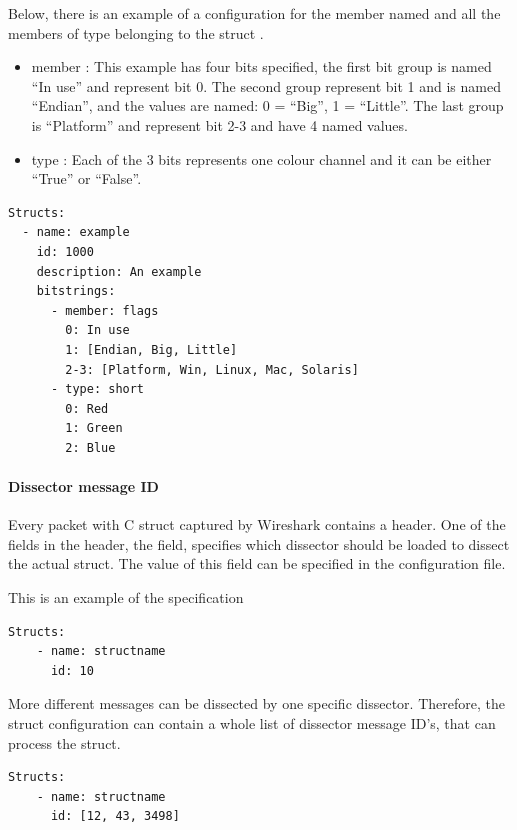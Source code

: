 \documentclass[A4paper,10pt,english]{sphinxmanual}
\begin{document}
Below, there is an example of a configuration for the member named  and all the members of  type belonging to the struct .
\begin{itemize}
\item {} 
member : This example has four bits specified, the first bit group is named ``In use'' and represent bit 0. The second group represent bit 1 and is named ``Endian'', and the values are named: 0 = ``Big'', 1 = ``Little''. The last group is ``Platform'' and represent bit 2-3 and have 4 named values.

\item {} 
type : Each of the 3 bits represents one colour channel and it can be either ``True'' or ``False''.

\end{itemize}

\begin{Verbatim}[commandchars=\\\{\}]
Structs:
  - name: example
    id: 1000
    description: An example
    bitstrings:
      - member: flags
        0: In use
        1: [Endian, Big, Little]
        2-3: [Platform, Win, Linux, Mac, Solaris]
      - type: short
        0: Red
        1: Green
        2: Blue
\end{Verbatim}


\paragraph{Dissector message ID}
\label{user/config:dissector-message-id}\label{user/config:ids}
Every packet with C struct captured by Wireshark contains a header. One of the fields in the header, the  field, specifies which dissector should be loaded to dissect the actual struct. The value of this field can be specified in the configuration file.

This is an example of the specification

\begin{Verbatim}[commandchars=\\\{\}]
Structs:
    - name: structname
      id: 10
\end{Verbatim}

More different messages can be dissected by one specific dissector. Therefore, the struct configuration can contain a whole list of dissector message ID's, that can process the struct.

\begin{Verbatim}[commandchars=\\\{\}]
Structs:
    - name: structname
      id: [12, 43, 3498]
\end{Verbatim}
\end{document}

